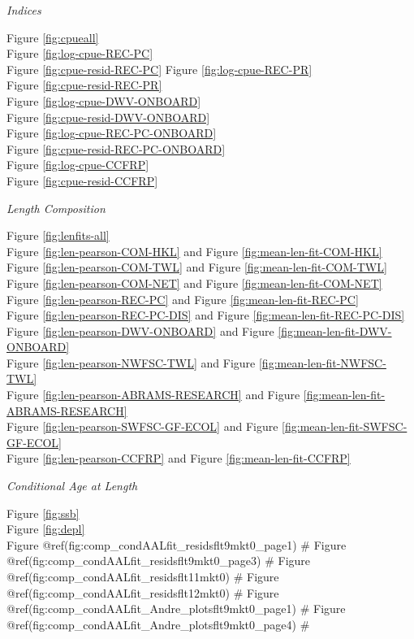 \documentclass[
  english,
  a4paper,
]{article}
\begin{document}
\emph{Indices}

Figure \ref{fig:cpueall}\\
Figure \ref{fig:log-cpue-REC-PC}\\
Figure \ref{fig:cpue-resid-REC-PC}
Figure \ref{fig:log-cpue-REC-PR}\\
Figure \ref{fig:cpue-resid-REC-PR}\\
Figure \ref{fig:log-cpue-DWV-ONBOARD}\\
Figure \ref{fig:cpue-resid-DWV-ONBOARD}\\
Figure \ref{fig:log-cpue-REC-PC-ONBOARD}\\
Figure \ref{fig:cpue-resid-REC-PC-ONBOARD}\\
Figure \ref{fig:log-cpue-CCFRP}\\
Figure \ref{fig:cpue-resid-CCFRP}

\emph{Length Composition}

Figure \ref{fig:lenfits-all}\\
Figure \ref{fig:len-pearson-COM-HKL} and Figure \ref{fig:mean-len-fit-COM-HKL}\\
Figure \ref{fig:len-pearson-COM-TWL} and Figure \ref{fig:mean-len-fit-COM-TWL}\\
Figure \ref{fig:len-pearson-COM-NET} and Figure \ref{fig:mean-len-fit-COM-NET}\\
Figure \ref{fig:len-pearson-REC-PC} and Figure \ref{fig:mean-len-fit-REC-PC}\\
Figure \ref{fig:len-pearson-REC-PC-DIS} and Figure \ref{fig:mean-len-fit-REC-PC-DIS}\\
Figure \ref{fig:len-pearson-DWV-ONBOARD} and Figure \ref{fig:mean-len-fit-DWV-ONBOARD}\\
Figure \ref{fig:len-pearson-NWFSC-TWL} and Figure \ref{fig:mean-len-fit-NWFSC-TWL}\\
Figure \ref{fig:len-pearson-ABRAMS-RESEARCH} and Figure \ref{fig:mean-len-fit-ABRAMS-RESEARCH}\\
Figure \ref{fig:len-pearson-SWFSC-GF-ECOL} and Figure \ref{fig:mean-len-fit-SWFSC-GF-ECOL}\\
Figure \ref{fig:len-pearson-CCFRP} and Figure \ref{fig:mean-len-fit-CCFRP}

\emph{Conditional Age at Length}

Figure \ref{fig:ssb}\\
Figure \ref{fig:depl}\\
Figure @ref(fig:comp\_condAALfit\_residsflt9mkt0\_page1) \#
Figure @ref(fig:comp\_condAALfit\_residsflt9mkt0\_page3) \#
Figure @ref(fig:comp\_condAALfit\_residsflt11mkt0) \#
Figure @ref(fig:comp\_condAALfit\_residsflt12mkt0) \#
Figure @ref(fig:comp\_condAALfit\_Andre\_plotsflt9mkt0\_page1) \#
Figure @ref(fig:comp\_condAALfit\_Andre\_plotsflt9mkt0\_page4) \#
\end{document}
